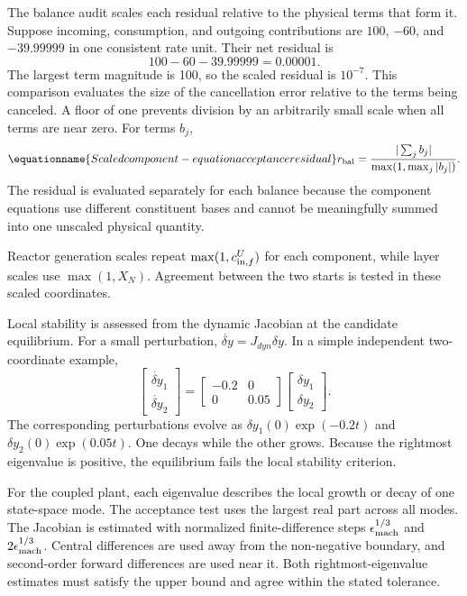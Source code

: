 The balance audit scales each residual relative to the physical terms that form it. Suppose incoming, consumption, and outgoing contributions are $100$, $-60$, and $-39.99999$ in one consistent rate unit. Their net residual is
\[
100-60-39.99999=0.00001.
\]
The largest term magnitude is 100, so the scaled residual is $10^{-7}$. This comparison evaluates the size of the cancellation error relative to the terms being canceled. A floor of one prevents division by an arbitrarily small scale when all terms are near zero. For terms $b_j$,
\begin{equation}
\equationname{Scaled component-equation acceptance residual}
r_{\rm bal}=\frac{|\sum_jb_j|}{\max(1,\max_j|b_j|)}.
\label{eq:plant_acceptance_balance}
\end{equation}
The residual is evaluated separately for each balance because the component equations use different constituent bases and cannot be meaningfully summed into one unscaled physical quantity.

Reactor generation scales repeat $\max(1,c_{{\rm in},f}^U)$ for each component, while layer scales use $\max(1,X_N)$. Agreement between the two starts is tested in these scaled coordinates.

Local stability is assessed from the dynamic Jacobian at the candidate equilibrium. For a small perturbation, $\dot{\delta y}=J_{dyn}\delta y$. In a simple independent two-coordinate example,
\[
\begin{bmatrix}\dot{\delta y}_1\\\dot{\delta y}_2\end{bmatrix}
=\begin{bmatrix}-0.2&0\\0&0.05\end{bmatrix}
\begin{bmatrix}\delta y_1\\\delta y_2\end{bmatrix}.
\]
The corresponding perturbations evolve as $\delta y_1(0)\exp(-0.2t)$ and $\delta y_2(0)\exp(0.05t)$. One decays while the other grows. Because the rightmost eigenvalue is positive, the equilibrium fails the local stability criterion.

For the coupled plant, each eigenvalue describes the local growth or decay of one state-space mode. The acceptance test uses the largest real part across all modes. The Jacobian is estimated with normalized finite-difference steps $\epsilon_{\rm mach}^{1/3}$ and $2\epsilon_{\rm mach}^{1/3}$. Central differences are used away from the non-negative boundary, and second-order forward differences are used near it. Both rightmost-eigenvalue estimates must satisfy the upper bound and agree within the stated tolerance.

